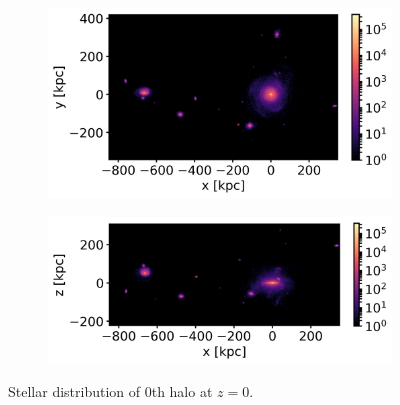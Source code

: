 \begin{figure}
    \centering
    \begin{subfigure}[b]{0.8\textwidth}
	    \includegraphics[width=\textwidth]{plots/Auriga/Au24_stars_xy_distribution_halo0.png}
	    \label{fig:Au24_stars_xy}
    \end{subfigure}
    
    \begin{subfigure}[b]{0.8\textwidth}
    \centering
    	\includegraphics[width=\textwidth]{plots/Auriga/Au24_stars_xz_distribution_halo0.png}
    	\label{fig:Au24_stars_xz}
    \end{subfigure}
    \caption{Stellar distribution of 0th halo at $\textit{z}=0$.}\label{fig:Stars_AU24}
\end{figure}


